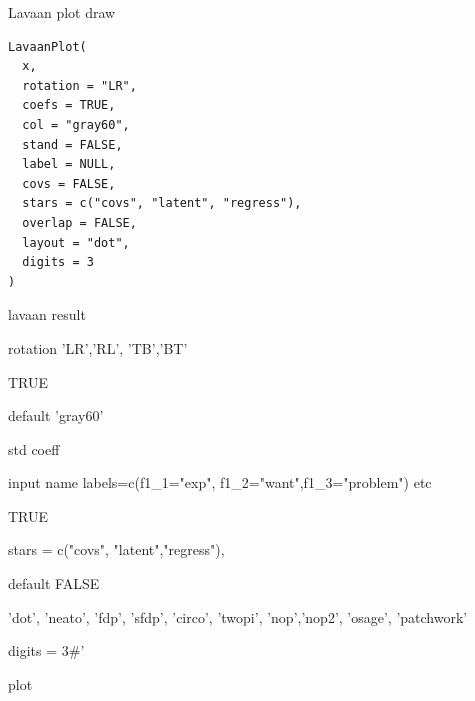 \documentclass[a4paper]{book}
\begin{document}
%
\begin{Description}
Lavaan plot draw
\end{Description}
%
\begin{Usage}
\begin{verbatim}
LavaanPlot(
  x,
  rotation = "LR",
  coefs = TRUE,
  col = "gray60",
  stand = FALSE,
  label = NULL,
  covs = FALSE,
  stars = c("covs", "latent", "regress"),
  overlap = FALSE,
  layout = "dot",
  digits = 3
)
\end{verbatim}
\end{Usage}
%
\begin{Arguments}
\begin{ldescription}
\item[\code{x}] lavaan result

\item[\code{rotation}] rotation 'LR','RL', 'TB','BT'

\item[\code{coefs}] TRUE

\item[\code{col}] default 'gray60'

\item[\code{stand}] std coeff

\item[\code{label}] input name labels=c(f1\_1="exp", f1\_2="want",f1\_3="problem") etc

\item[\code{covs}] TRUE

\item[\code{stars}] stars = c("covs", "latent","regress"),

\item[\code{overlap}] default FALSE

\item[\code{layout}] 'dot', 'neato', 'fdp', 'sfdp', 'circo', 'twopi', 'nop','nop2', 'osage', 'patchwork'

\item[\code{digits}] digits = 3\#'
\end{ldescription}
\end{Arguments}
%
\begin{Value}
plot
\end{Value}
%
\end{document}
